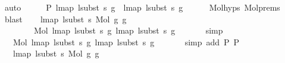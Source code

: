 \begin{isabellebody}
\ auto\isanewline
\ \ \isamarkupfalse%
\ \isamarkupfalse%
\ P{}{\isacharcolon}{\kern0pt}\ {\isachardoublequoteopen}lmap\ {\isacharparenleft}{\kern0pt}lsubst\ s{\isacharparenright}{\kern0pt}\ g{}\ {\isacharequal}{\kern0pt}\ lmap\ {\isacharparenleft}{\kern0pt}lsubst\ s{}{\isacharparenright}{\kern0pt}\ g{}{\isachardoublequoteclose}\isanewline
\ \ \ \ \isamarkupfalse%
\ Mol{\isachardot}{\kern0pt}hyps{\isacharparenleft}{\kern0pt}{}{\isacharparenright}{\kern0pt}\ Mol{\isachardot}{\kern0pt}prems{\isacharparenleft}{\kern0pt}{}{\isacharparenright}{\kern0pt}\ \isamarkupfalse%
\ blast\isanewline
\isanewline
\ \ \isamarkupfalse%
\ {\isachardoublequoteopen}lmap\ {\isacharparenleft}{\kern0pt}lsubst\ s{\isacharparenright}{\kern0pt}\ {\isacharparenleft}{\kern0pt}Mol\ g{}\ g{}{\isacharparenright}{\kern0pt}\ {\isacharequal}{\kern0pt}\isanewline
\ \ \ \ \ \ \ \ Mol\ {\isacharparenleft}{\kern0pt}lmap\ {\isacharparenleft}{\kern0pt}lsubst\ s{\isacharparenright}{\kern0pt}\ g{}{\isacharparenright}{\kern0pt}\ {\isacharparenleft}{\kern0pt}lmap\ {\isacharparenleft}{\kern0pt}lsubst\ s{\isacharparenright}{\kern0pt}\ g{}{\isacharparenright}{\kern0pt}{\isachardoublequoteclose}\isanewline
\ \ \ \ \ \isamarkupfalse%
\ simp\isanewline
\ \ \isamarkupfalse%
\ \isamarkupfalse%
\ {\isachardoublequoteopen}{\isachardot}{\kern0pt}{\isachardot}{\kern0pt}{\isachardot}{\kern0pt}\ {\isacharequal}{\kern0pt}\ Mol\ {\isacharparenleft}{\kern0pt}lmap\ {\isacharparenleft}{\kern0pt}lsubst\ s{}{\isacharparenright}{\kern0pt}\ g{}{\isacharparenright}{\kern0pt}\ {\isacharparenleft}{\kern0pt}lmap\ {\isacharparenleft}{\kern0pt}lsubst\ s{}{\isacharparenright}{\kern0pt}\ g{}{\isacharparenright}{\kern0pt}{\isachardoublequoteclose}\isanewline
\ \ \ \ \ \isamarkupfalse%
\ {\isacharparenleft}{\kern0pt}simp\ add{\isacharcolon}{\kern0pt}\ P{}\ P{}{\isacharparenright}{\kern0pt}\isanewline
\ \ \isamarkupfalse%
\ \isamarkupfalse%
\ {\isachardoublequoteopen}{\isachardot}{\kern0pt}{\isachardot}{\kern0pt}{\isachardot}{\kern0pt}\ {\isacharequal}{\kern0pt}\ lmap\ {\isacharparenleft}{\kern0pt}lsubst\ s{}{\isacharparenright}{\kern0pt}\ {\isacharparenleft}{\kern0pt}Mol\ g{}\ g{}{\isacharparenright}{\kern0pt}{\isachardoublequoteclose}\isanewline

\end{isabellebody}
